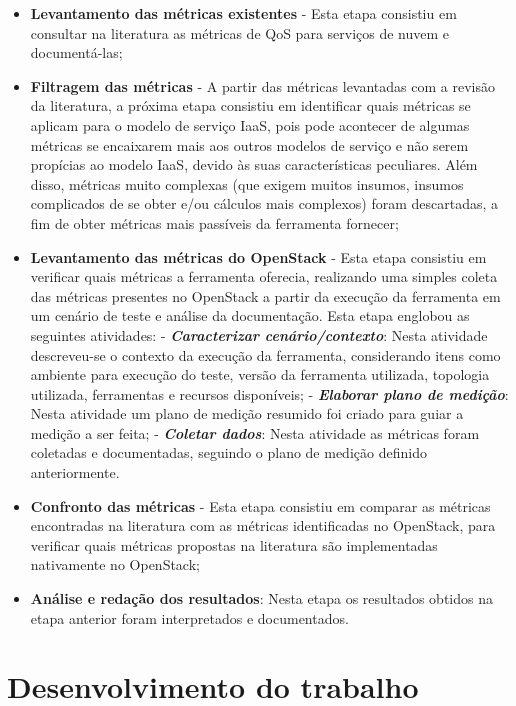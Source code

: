 \documentclass[conference]{IEEEtran}
\begin{document}
\begin{itemize}
 \item \textbf{Levantamento das métricas existentes} - Esta etapa consistiu em consultar na literatura as métricas de QoS para
	serviços de nuvem e documentá-las;
 \item \textbf{Filtragem das métricas} - A partir das métricas levantadas com a revisão da literatura, a próxima etapa consistiu em 
	identificar quais métricas se aplicam para o modelo de serviço IaaS, pois pode acontecer de algumas métricas se encaixarem
	mais aos outros modelos de serviço e não serem propícias ao modelo IaaS, devido às suas características peculiares. Além disso,
	métricas muito complexas (que exigem muitos insumos, insumos complicados de se obter e/ou cálculos mais complexos) foram descartadas,
	a fim de obter métricas mais passíveis da ferramenta fornecer;
 \item \textbf{Levantamento das métricas do OpenStack} - Esta etapa consistiu em verificar quais métricas a ferramenta oferecia,
	realizando uma simples coleta das métricas presentes no OpenStack a partir da execução da ferramenta em um cenário de teste 
	e análise da documentação.
	Esta etapa englobou as seguintes atividades:
	\subitem - \emph{\textbf{Caracterizar cenário/contexto}}: Nesta atividade descreveu-se o contexto da execução da ferramenta,
		 considerando itens como ambiente para execução do teste, versão da ferramenta utilizada, topologia utilizada, ferramentas
		 e recursos disponíveis;
	\subitem - \emph{\textbf{Elaborar plano de medição}}: Nesta atividade um plano de medição resumido foi criado para guiar a medição
		 a ser feita;
	\subitem - \emph{\textbf{Coletar dados}}: Nesta atividade as métricas foram coletadas e documentadas, seguindo o
		 plano de medição definido anteriormente.
 \item \textbf{Confronto das métricas} - Esta etapa consistiu em comparar as métricas encontradas na literatura com as métricas
	identificadas no OpenStack, para verificar quais métricas propostas na literatura são implementadas nativamente no OpenStack;
 \item \textbf{Análise e redação dos resultados}: Nesta etapa os resultados obtidos na etapa anterior foram interpretados e documentados.
\end{itemize}

\section{Desenvolvimento do trabalho} %
\end{document}
